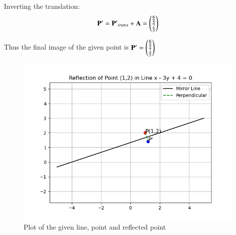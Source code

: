 \documentclass[journal]{IEEEtran}
\begin{document}
Inverting the translation:
\begin{align}
    \mathbf{P'}=\mathbf{P'}_{trans}+\mathbf{A}=\begin{pmatrix}\frac{6}{5}\\ \frac{7}{5}\end{pmatrix}
\end{align}

Thus the final image of the given point is $\mathbf{P'}=\begin{pmatrix}\frac{6}{5}\\ \frac{7}{5}\end{pmatrix}$

\begin{figure}[h!]
   \centering
   \includegraphics[width=0.7\linewidth]{figs/plot.png}
   \caption{Plot of the given line, point and reflected point}
   \label{}
\end{figure}
\end{document}
